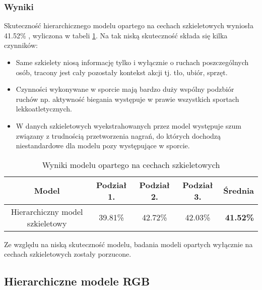 \subsubsection{Wyniki} 
Skuteczność hierarchicznego modelu opartego na cechach szkieletowych wyniosła 41.52\% , wyliczona w tabeli \ref{tab:szkielety-wyniki}. Na tak niską skuteczność składa się kilka czynników: \begin{itemize}
    \item Same szkielety niosą informację tylko i wyłącznie o ruchach poszczególnych osób, tracony jest cały pozostały kontekst akcji tj. tło, ubiór, sprzęt.
    \item Czynności wykonywane w sporcie mają bardzo duży wspólny podzbiór ruchów np. aktywność biegania występuje w prawie wszystkich sportach lekkoatletycznych. 
    \item W danych szkieletowych wyekstrahowanych przez model występuje szum związany z trudnością przetworzenia nagrań, do których dochodzą niestandardowe dla modelu pozy występujące w sporcie. 
\end{itemize}
\begin{table}[!h]  \centering
\caption{Wyniki modelu opartego na cechach szkieletowych}
\begin{tabular} {| c | c | c | c | r |} \hline
    Model & Podział 1.  & Podział 2. & Podział 3. & \textbf{Średnia} \\ \hline\hline
    Hierarchiczny model szkieletowy &  39.81\%	& 42.72\%	& 42.03\% & \textbf{41.52\%} \\ \hline
\end{tabular}
    \label{tab:szkielety-wyniki}
\end{table}
Ze względu na niską skuteczność modelu, badania modeli opartych wyłącznie na cechach szkieletowych zostały porzucone. 

\subsection{Hierarchiczne modele RGB}

